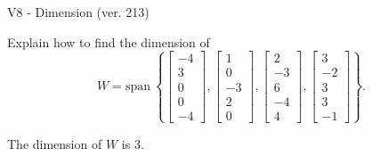 \begin{exercise}
  \begin{exerciseTitle}V8 - Dimension (ver. 213)\end{exerciseTitle}
  \begin{exerciseStatement}
    Explain how to find the dimension of 
\[W=\mathrm{span}\ \left\{\left[\begin{array}{r}
-4 \\
3 \\
0 \\
0 \\
-4
\end{array}\right] , \left[\begin{array}{r}
1 \\
0 \\
-3 \\
2 \\
0
\end{array}\right] , \left[\begin{array}{r}
2 \\
-3 \\
6 \\
-4 \\
4
\end{array}\right] , \left[\begin{array}{r}
3 \\
-2 \\
3 \\
3 \\
-1
\end{array}\right]\right\}.\]



  \end{exerciseStatement}
  \begin{exerciseAnswer}
   The dimension of \(W\) is  \(3\).
  


  \end{exerciseAnswer}
\end{exercise}